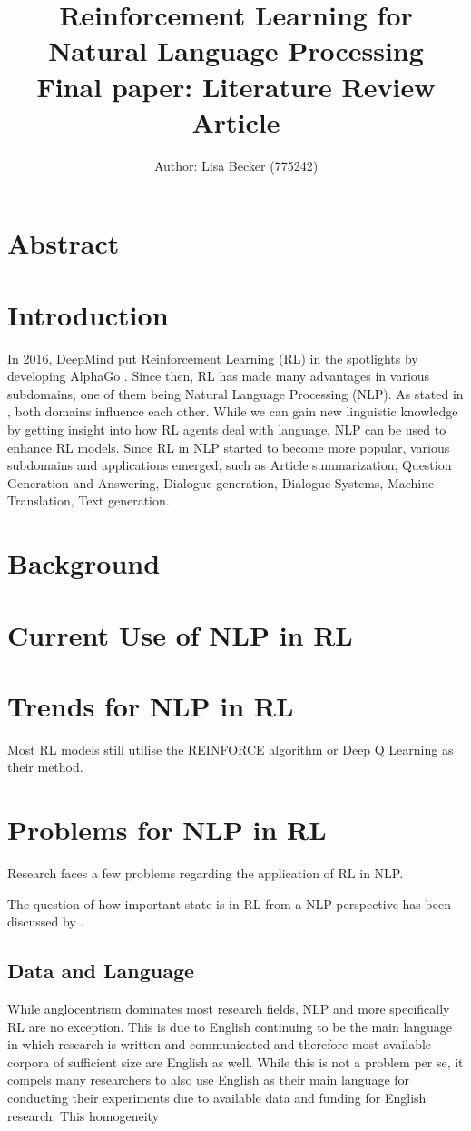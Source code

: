 \documentclass[11pt,a4paper]{article}
\title{{\LARGE Reinforcement Learning for Natural Language Processing}\\[1.5mm]
{\large Final paper: Literature Review Article}\\[1.5mm]}
\author{Author: Lisa Becker (775242) }
\begin{document}
\maketitle
\section{Abstract}


\section{Introduction}
In 2016, DeepMind put Reinforcement Learning (RL) in the spotlights by developing AlphaGo \citep{alphago}. Since then, RL has made many advantages in various subdomains, one of them being Natural Language Processing (NLP). As stated in \citet{ijcai2019}, both domains influence each other. While we can gain new linguistic knowledge by getting insight into how RL agents deal with language, NLP can be used to enhance RL models. Since RL in NLP started to become more popular, various subdomains and applications emerged, such as Article summarization, Question Generation and Answering, Dialogue generation, Dialogue Systems, Machine Translation, Text generation.

\section{Background}

\section{Current Use of NLP in RL}


\section{Trends for NLP in RL}
Most RL models still utilise the REINFORCE algorithm or Deep Q Learning as their method.

\section{Problems for NLP in RL}
Research faces a few problems regarding the application of RL in NLP. 

The question of how important state is in RL from a NLP perspective has been discussed by \citet{madureira2020}.

\subsection{Data and Language}
While anglocentrism dominates most research fields, NLP and more specifically RL are no exception. This is due to English continuing to be the main language in which research is written and communicated and therefore most available corpora of sufficient size are English as well. While this is not a problem per se, it compels many researchers to also use English as their main language for conducting their experiments due to available data and funding for English research. This homogeneity 
\end{document}
